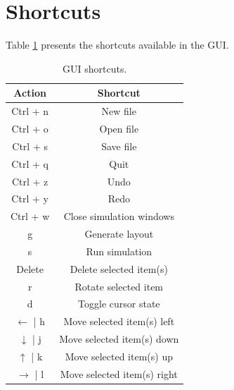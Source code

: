 \section{Shortcuts}
Table \ref{tb:shortcuts} presents the shortcuts available in the GUI.

\begin{table}
\begin{center}
\begin{singlespace}
\begin{tabular}{| c | c |}
\hline
Action & Shortcut \\
\hline
\hline
Ctrl + n & New file \\
Ctrl + o & Open file \\
Ctrl + s & Save file \\
Ctrl + q & Quit \\
Ctrl + z & Undo \\
Ctrl + y & Redo \\
Ctrl + w & Close simulation windows \\
g & Generate layout \\
s & Run simulation \\
Delete & Delete selected item(s) \\
r & Rotate selected item \\
d & Toggle cursor state \\
$\leftarrow$ | h & Move selected item(s) left \\
$\downarrow$ | j & Move selected item(s) down \\
$\uparrow$ | k & Move selected item(s) up \\
$\rightarrow$ | l & Move selected item(s) right \\
\hline
\end{tabular}
\end{singlespace}
\end{center}
\caption[GUI shortcuts]{GUI shortcuts.}
\label{tb:shortcuts}
\end{table}
